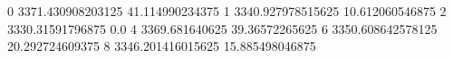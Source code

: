 0 3371.430908203125 41.114990234375
1 3340.927978515625 10.612060546875
2 3330.31591796875 0.0
4 3369.681640625 39.36572265625
6 3350.608642578125 20.292724609375
8 3346.201416015625 15.885498046875
